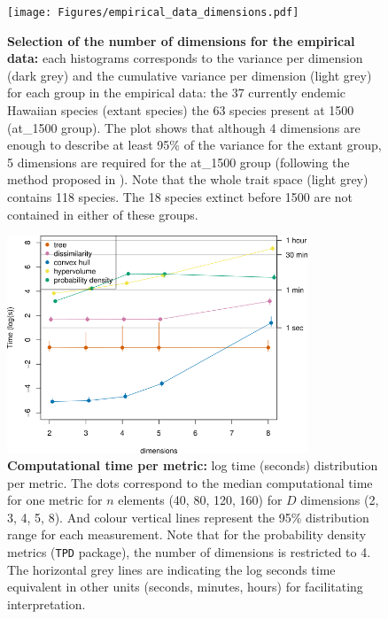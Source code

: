 \documentclass[12pt,letterpaper]{article}
\begin{document}
\begin{figure}[!htbp]
\centering
   \texttt{[image: Figures/empirical\_data\_dimensions.pdf]}
\caption{\scriptsize{\textbf{Selection of the number of dimensions for the empirical data:} each histograms corresponds to the variance per dimension (dark grey) and the cumulative variance per dimension (light grey) for each group in the empirical data: the 37 currently endemic Hawaiian species (extant species) the 63 species present at 1500 (at_1500 group). The plot shows that although 4 dimensions are enough to describe at least 95\% of the variance for the extant group, 5 dimensions are required for the at_1500 group (following the method proposed in \cite{guillerme2023innovation}). Note that the whole trait space (light grey) contains 118 species. The 18 species extinct before 1500 are not contained in either of these groups.
}}
\label{Fig:empirical_dimensions}
\end{figure}
\bigskip










\begin{figure}[!htbp]
\centering
   \includegraphics[width=0.8\textwidth]{Figures/time_per_metric}
\caption{\scriptsize{\textbf{Computational time per metric:} log time (seconds) distribution per metric. The dots correspond to the median computational time for one metric for $n$ elements (40, 80, 120, 160) for $D$ dimensions (2, 3, 4, 5, 8). And colour vertical lines represent the 95\% distribution range for each measurement. Note that for the probability density metrics (\texttt{TPD} package), the number of dimensions is restricted to 4. The horizontal grey lines are indicating the log seconds time equivalent in other units (seconds, minutes, hours) for facilitating interpretation.
}}
\label{Fig:metrics_time}
\end{figure}
\bigskip
\end{document}
